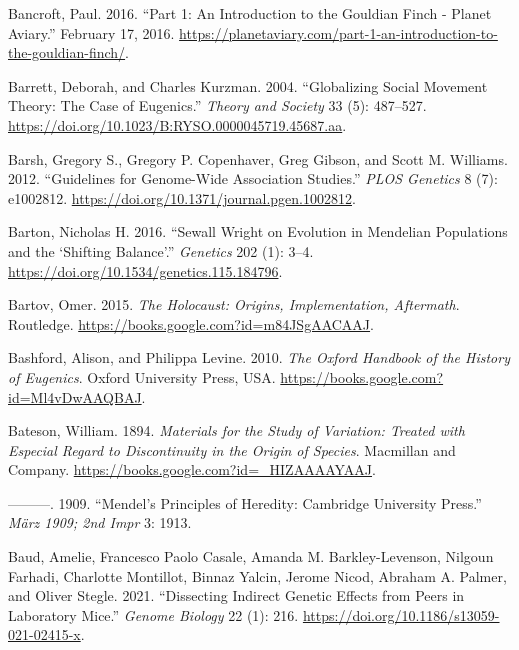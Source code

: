 \documentclass[
]{book}
\newlength{\cslhangindent}
\newlength{\cslentryspacingunit} %
\newenvironment{CSLReferences}[2] %
 {%
  \setlength{\parindent}{0pt}
  \ifodd #1
  \let\oldpar\par
  \def\par{\hangindent=\cslhangindent\oldpar}
  \fi
  \setlength{\parskip}{#2\cslentryspacingunit}
 }%
 {}
\begin{document}
\begin{CSLReferences}{1}{0}
\leavevmode{}%
Bancroft, Paul. 2016. {``Part 1: {An} Introduction to the {Gouldian} Finch - {Planet Aviary}.''} February 17, 2016. \url{https://planetaviary.com/part-1-an-introduction-to-the-gouldian-finch/}.

\leavevmode{}%
Barrett, Deborah, and Charles Kurzman. 2004. {``Globalizing Social Movement Theory: {The} Case of Eugenics.''} \emph{Theory and Society} 33 (5): 487--527. \url{https://doi.org/10.1023/B:RYSO.0000045719.45687.aa}.

\leavevmode{}%
Barsh, Gregory S., Gregory P. Copenhaver, Greg Gibson, and Scott M. Williams. 2012. {``Guidelines for {Genome-Wide Association Studies}.''} \emph{PLOS Genetics} 8 (7): e1002812. \url{https://doi.org/10.1371/journal.pgen.1002812}.

\leavevmode{}%
Barton, Nicholas H. 2016. {``Sewall {Wright} on {Evolution} in {Mendelian Populations} and the {`{Shifting Balance}'}.''} \emph{Genetics} 202 (1): 3--4. \url{https://doi.org/10.1534/genetics.115.184796}.

\leavevmode{}%
Bartov, Omer. 2015. \emph{The {Holocaust}: {Origins}, {Implementation}, {Aftermath}}. {Routledge}. \url{https://books.google.com?id=m84JSgAACAAJ}.

\leavevmode{}%
Bashford, Alison, and Philippa Levine. 2010. \emph{The {Oxford Handbook} of the {History} of {Eugenics}}. {Oxford University Press, USA}. \url{https://books.google.com?id=Ml4vDwAAQBAJ}.

\leavevmode{}%
Bateson, William. 1894. \emph{Materials for the {Study} of {Variation}: {Treated} with {Especial Regard} to {Discontinuity} in the {Origin} of {Species}}. {Macmillan and Company}. \url{https://books.google.com?id=_HIZAAAAYAAJ}.

\leavevmode{}%
---------. 1909. {``Mendel's {Principles} of {Heredity}: {Cambridge University Press}.''} \emph{März 1909; 2nd Impr} 3: 1913.

\leavevmode{}%
Baud, Amelie, Francesco Paolo Casale, Amanda M. Barkley-Levenson, Nilgoun Farhadi, Charlotte Montillot, Binnaz Yalcin, Jerome Nicod, Abraham A. Palmer, and Oliver Stegle. 2021. {``Dissecting Indirect Genetic Effects from Peers in Laboratory Mice.''} \emph{Genome Biology} 22 (1): 216. \url{https://doi.org/10.1186/s13059-021-02415-x}.


\end{CSLReferences}
\end{document}
